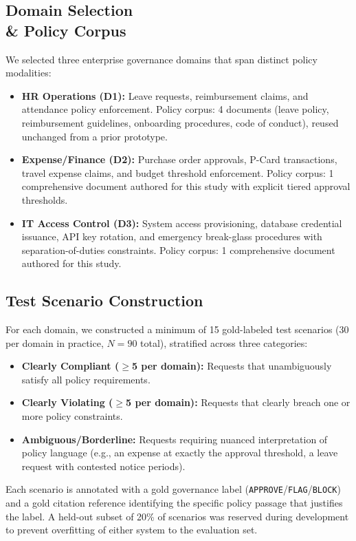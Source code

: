 \documentclass[sigconf,screen]{acmart}
\begin{document}
\subsection{Domain Selection \\\& Policy Corpus}
We selected three enterprise governance domains that span distinct policy modalities:
\begin{itemize}[leftmargin=*]
    \item \textbf{HR Operations (D1):} Leave requests, reimbursement claims, and attendance policy enforcement. Policy corpus: 4 documents (leave policy, reimbursement guidelines, onboarding procedures, code of conduct), reused unchanged from a prior prototype.
    \item \textbf{Expense/Finance (D2):} Purchase order approvals, P-Card transactions, travel expense claims, and budget threshold enforcement. Policy corpus: 1 comprehensive document authored for this study with explicit tiered approval thresholds.
    \item \textbf{IT Access Control (D3):} System access provisioning, database credential issuance, API key rotation, and emergency break-glass procedures with separation-of-duties constraints. Policy corpus: 1 comprehensive document authored for this study.
\end{itemize}

\subsection{Test Scenario Construction}
For each domain, we constructed a minimum of 15 gold-labeled test scenarios (30 per domain in practice, $N=90$ total), stratified across three categories:
\begin{itemize}[leftmargin=*]
    \item \textbf{Clearly Compliant ($\geq$5 per domain):} Requests that unambiguously satisfy all policy requirements.
    \item \textbf{Clearly Violating ($\geq$5 per domain):} Requests that clearly breach one or more policy constraints.
    \item \textbf{Ambiguous/Borderline:} Requests requiring nuanced interpretation of policy language (e.g., an expense at exactly the approval threshold, a leave request with contested notice periods).
\end{itemize}
Each scenario is annotated with a gold governance label (\texttt{APPROVE}/\texttt{FLAG}/\texttt{BLOCK}) and a gold citation reference identifying the specific policy passage that justifies the label. A held-out subset of 20\% of scenarios was reserved during development to prevent overfitting of either system to the evaluation set.
\end{document}
